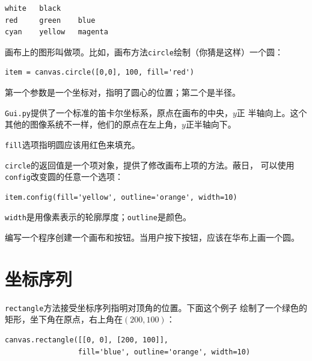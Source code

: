 \begin{verbatim}
white   black
red     green    blue   
cyan    yellow   magenta
\end{verbatim}
\afterverb
%

画布上的图形叫做项。比如，画布方法{\tt circle}绘制（你猜是这样）一个圆：


\beforeverb
\begin{verbatim}
item = canvas.circle([0,0], 100, fill='red')
\end{verbatim}
\afterverb


第一个参数是一个坐标对，指明了圆心的位置；第二个是半径。


{\tt Gui.py}提供了一个标准的笛卡尔坐标系，原点在画布的中央，$y$正
半轴向上。这个其他的图像系统不一样，他们的原点在左上角，$y$正半轴向下。

{\tt fill}选项指明圆应该用红色来填充。

{\tt circle}的返回值是一个项对象，提供了修改画布上项的方法。蔽日，
可以使用{\tt config}改变圆的任意一个选项：

\beforeverb
\begin{verbatim}
item.config(fill='yellow', outline='orange', width=10)
\end{verbatim}
\afterverb

{\tt width}是用像素表示的轮廓厚度；{\tt outline}是颜色。

\begin{ex}
\label{circle}

编写一个程序创建一个画布和按钮。当用户按下按钮，应该在华布上画一个圆。
\end{ex}

\section{坐标序列}


{\tt rectangle}方法接受坐标序列指明对顶角的位置。下面这个例子
绘制了一个绿色的矩形，坐下角在原点，右上角在$(200,100)$：

\beforeverb
\begin{verbatim}
canvas.rectangle([[0, 0], [200, 100]], 
                 fill='blue', outline='orange', width=10)
\end{verbatim}
\afterverb

